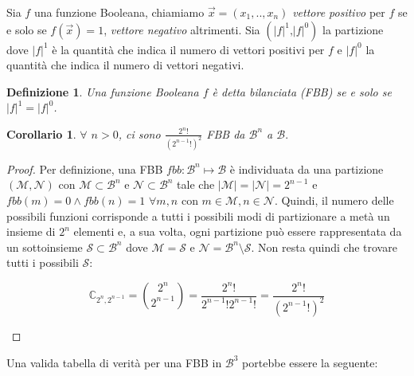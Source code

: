 \documentclass[12pt,a4paper,openright]{report}
\newtheorem{mydef}{Definizione}[chapter]
\newtheorem*{mycor}{Corollario}
\begin{document}
Sia $f$ una funzione Booleana, chiamiamo $\vec{x}=(x_1,..,x_n)$ \textit{vettore positivo} per $f$ se e solo se
$f(\vec{x}) = 1$, \textit{vettore negativo} altrimenti. Sia $({\left\vert{f}\right\vert}^1 \text{,} {\left\vert{f}\right\vert}^0)$ la partizione dove ${\left\vert{f}\right\vert}^1$ è la quantità che indica il numero di vettori
positivi per $f$ e ${\left\vert{f}\right\vert}^0$ la quantità che indica il numero di vettori negativi.
\begin{mydef}
    Una funzione Booleana $f$ è detta bilanciata (FBB) se e solo se ${\left\vert{f}\right\vert}^1 = {\left\vert{f}\right\vert}^0$.
\end{mydef}
\begin{mycor}
    $\forall$ $n > 0$, ci sono $\frac{2^{n}!}{(2^{n-1}!)^2}$ FBB da $\mathcal{B}^n$ a $\mathcal{B}.$
\end{mycor}
\begin{proof}
    Per definizione, una FBB $fbb:\mathcal{B}^n\mapsto\mathcal{B}$ è individuata da una partizione $(\mathcal{M},\mathcal{N})$ con $\mathcal{M}\subset\mathcal{B}^n$ e $\mathcal{N}\subset\mathcal{B}^n$ tale che
    $\left\vert{\mathcal{M}}\right\vert = \left\vert{\mathcal{N}}\right\vert = 2^{n-1}$ e $fbb(m)=0 \land fbb(n)=1$ $\forall{m,n}$ con $m\in\mathcal{M},n\in\mathcal{N}$.
    Quindi, il numero delle possibili funzioni corrisponde a tutti i possibili modi di partizionare a metà un insieme di $2^n$ elementi e, a sua volta, ogni partizione può essere rappresentata 
    da un sottoinsieme $\mathcal{S}\subset\mathcal{B}^n$ dove $\mathcal{M}=\mathcal{S}$ e $\mathcal{N}=\mathcal{B}^n \setminus \mathcal{S}$.
    Non resta quindi che trovare tutti i possibili $\mathcal{S}$:  
    \begin{center}
    \[
        \mathbb{C}_{2^n,2^{n-1}}= \binom{2^n}{2^{n-1}} = \frac{2^n!}{2^{n-1}!2^{n-1}!} = \frac{2^n!}{(2^{n-1}!)^2}
    \]
    \end{center}
\end{proof}
Una valida tabella di verità per una FBB in $\mathcal{B}^3$ portebbe essere la seguente:
\end{document}
